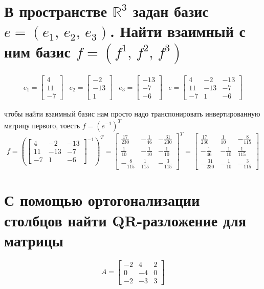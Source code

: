 \documentclass{article}
\newcommand{\R}{\mathbb{R}}
\renewcommand{\l}{\left}
\renewcommand{\r}{\right}
\begin{document}
  \section{В пространстве $\R^3$ задан базис $e = (e_1,\, e_2,\, e_3)$. Найти взаимный с ним базис $f = (f^1,\, f^2,\, f^3)$}
  $$\begin{matrix}
    e_1 = \begin{bmatrix}4\\11\\-7\end{bmatrix} &
    e_2 = \begin{bmatrix}-2\\-13\\1\end{bmatrix} &
    e_3 = \begin{bmatrix}-13\\-7\\-6\end{bmatrix} &
    e = \begin{bmatrix}4 & -2 & -13\\11 & -13 & -7\\-7 & 1 & -6\end{bmatrix}
  \end{matrix}$$

  \noindent
  чтобы найти взаимный базис нам просто надо транспонировать инвертированную матрицу первого, тоесть $f = \l(e^{-1}\r)^T$
  $$ f = \l(\begin{bmatrix}4 & -2 & -13\\11 & -13 & -7\\-7 & 1 & -6\end{bmatrix}^{-1}\r)^T = \left[\begin{matrix}\frac{17}{230} & - \frac{1}{46} & - \frac{31}{230}\\\frac{1}{10} & - \frac{1}{10} & - \frac{1}{10}\\- \frac{8}{115} & \frac{1}{115} & - \frac{3}{115}\end{matrix}\right]^T = \left[\begin{matrix}\frac{17}{230} & \frac{1}{10} & - \frac{8}{115}\\- \frac{1}{46} & - \frac{1}{10} & \frac{1}{115}\\- \frac{31}{230} & - \frac{1}{10} & - \frac{3}{115}\end{matrix}\right] $$

  \section{С помощью ортогонализации столбцов найти QR-разложение для матрицы}
  $$ A = \left[\begin{matrix}-2 & 4 & 2\\0 & -4 & 0\\-2 & -3 & 3\end{matrix}\right] $$
\end{document}

